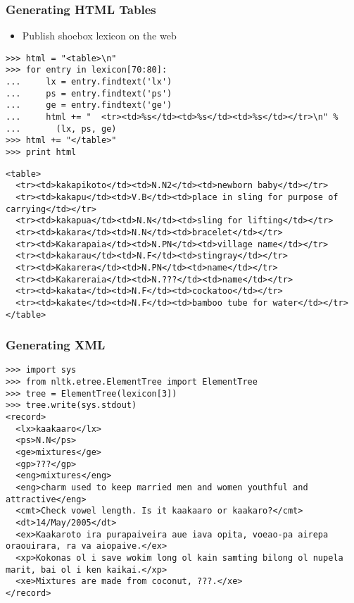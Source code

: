 \documentclass{beamer}             %
\begin{document}
\begin{frame}[fragile]
\frametitle{Generating HTML Tables}

\begin{itemize}
\item Publish shoebox lexicon on the web
\end{itemize}
\scriptsize

\begin{verbatim}
>>> html = "<table>\n"
>>> for entry in lexicon[70:80]:
...     lx = entry.findtext('lx')
...     ps = entry.findtext('ps')
...     ge = entry.findtext('ge')
...     html += "  <tr><td>%s</td><td>%s</td><td>%s</td></tr>\n" %
...       (lx, ps, ge)
>>> html += "</table>"
>>> print html
\end{verbatim}

\tiny

\begin{verbatim}
<table>
  <tr><td>kakapikoto</td><td>N.N2</td><td>newborn baby</td></tr>
  <tr><td>kakapu</td><td>V.B</td><td>place in sling for purpose of carrying</td></tr>
  <tr><td>kakapua</td><td>N.N</td><td>sling for lifting</td></tr>
  <tr><td>kakara</td><td>N.N</td><td>bracelet</td></tr>
  <tr><td>Kakarapaia</td><td>N.PN</td><td>village name</td></tr>
  <tr><td>kakarau</td><td>N.F</td><td>stingray</td></tr>
  <tr><td>Kakarera</td><td>N.PN</td><td>name</td></tr>
  <tr><td>Kakareraia</td><td>N.???</td><td>name</td></tr>
  <tr><td>kakata</td><td>N.F</td><td>cockatoo</td></tr>
  <tr><td>kakate</td><td>N.F</td><td>bamboo tube for water</td></tr>
</table>
\end{verbatim}
\end{frame}

\begin{frame}[fragile]
\frametitle{Generating XML}

\tiny
\begin{verbatim}
>>> import sys
>>> from nltk.etree.ElementTree import ElementTree
>>> tree = ElementTree(lexicon[3])
>>> tree.write(sys.stdout)
<record>
  <lx>kaakaaro</lx>
  <ps>N.N</ps>
  <ge>mixtures</ge>
  <gp>???</gp>
  <eng>mixtures</eng>
  <eng>charm used to keep married men and women youthful and attractive</eng>
  <cmt>Check vowel length. Is it kaakaaro or kaakaro?</cmt>
  <dt>14/May/2005</dt>
  <ex>Kaakaroto ira purapaiveira aue iava opita, voeao-pa airepa oraouirara, ra va aiopaive.</ex>
  <xp>Kokonas ol i save wokim long ol kain samting bilong ol nupela marit, bai ol i ken kaikai.</xp>
  <xe>Mixtures are made from coconut, ???.</xe>
</record>
\end{verbatim}
\end{frame}
\end{document}
